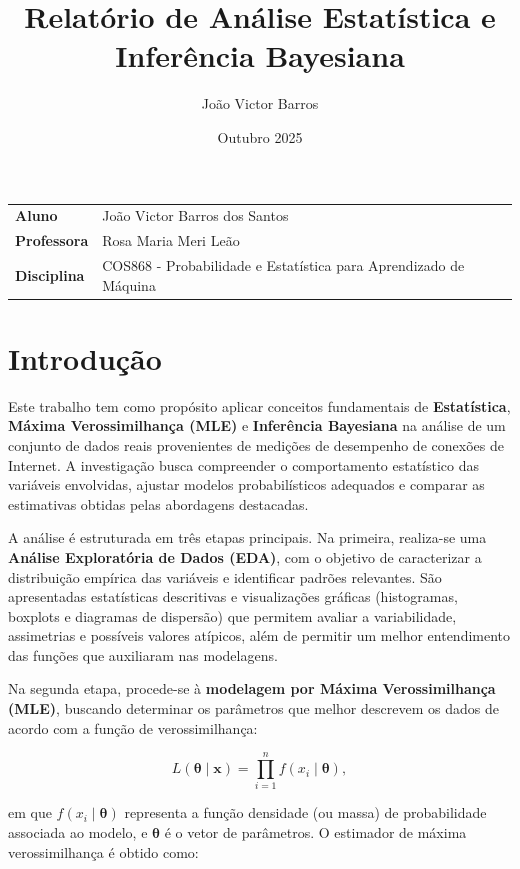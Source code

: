 \documentclass{article}
\title{Relatório de Análise Estatística e Inferência Bayesiana}
\author{João Victor Barros}
\date{Outubro 2025}
\begin{document}
\maketitle

\noindent\begin{tabular}{@{}ll}
    \textbf{Aluno} & João Victor Barros dos Santos\\
    \textbf{Professora} & Rosa Maria Meri Leão\\
    \textbf{Disciplina} & COS868 - Probabilidade e Estatística para Aprendizado de Máquina
\end{tabular}

\section{Introdução}

Este trabalho tem como propósito aplicar conceitos fundamentais de \textbf{Estatística},
\textbf{Máxima Verossimilhança (MLE)} e \textbf{Inferência Bayesiana} na análise de um conjunto
de dados reais provenientes de medições de desempenho de conexões de Internet. A investigação
busca compreender o comportamento estatístico das variáveis envolvidas, ajustar modelos
probabilísticos adequados e comparar as estimativas obtidas pelas abordagens destacadas.

A análise é estruturada em três etapas principais. Na primeira, realiza-se uma
\textbf{Análise Exploratória de Dados (EDA)}, com o objetivo de caracterizar a distribuição
empírica das variáveis e identificar padrões relevantes. São apresentadas estatísticas
descritivas e visualizações gráficas (histogramas, boxplots e diagramas de dispersão) que
permitem avaliar a variabilidade, assimetrias e possíveis valores atípicos, além de permitir um melhor entendimento das funções que auxiliaram nas modelagens.

Na segunda etapa, procede-se à \textbf{modelagem por Máxima Verossimilhança (MLE)}, buscando
determinar os parâmetros que melhor descrevem os dados de acordo com a função de
verossimilhança:

\begin{equation}
	L(\boldsymbol{\theta} \mid \mathbf{x}) = \prod_{i=1}^{n} f(x_i \mid \boldsymbol{\theta}),
	\label{eq:likelihood}
\end{equation}

em que $f(x_i \mid \boldsymbol{\theta})$ representa a função densidade (ou massa) de probabilidade
associada ao modelo, e $\boldsymbol{\theta}$ é o vetor de parâmetros. O estimador de máxima
verossimilhança é obtido como:
\end{document}
